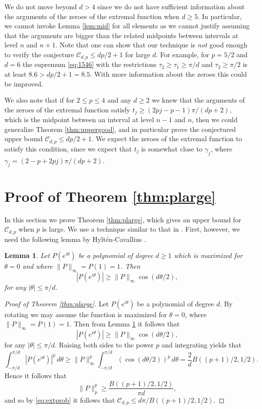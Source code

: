 \documentclass{amsart}
\theoremstyle{plain}
\newtheorem{lemma}[theorem]{Lemma}
\theoremstyle{remark}
\begin{document}
	We do not move beyond $d > 4$ since we do not have sufficient information about the arguments of the zeroes of the extremal function when $d \geq 5$. In particular, we cannot invoke Lemma \ref{lem:mid} for all elements as we cannot justify assuming that the arguments are bigger than the related midpoints between intervals at level $n$ and $n+1$. 
	Note that one can show that our technique is \emph{not} good enough to verify the conjecture $\mathscr{C}_{d,p} \leq dp/2+1$ for large $d$. For example, for $p=5/2$ and $d=6$ the supremum \eqref{eq:1546} with the restrictions $\tau_2 \geq \tau_1 \geq \pi/d$ and $\tau_3 \geq \pi/2$ is at least $8.6>dp/2+1=8.5$. With more information about the zeroes this could be improved. 
	
	We also note that if for $2 \leq p \leq 4$ and any $d \geq 2$ we knew that the arguments of the zeroes of the extremal function satisfy $t_j \geq (2pj-p-1)\pi/(dp+2)$, which is the midpoint between an interval at level $n-1$ and $n$, then we could generalize Theorem \ref{thm:uppergood}, and in particular prove the conjectured upper bound $\mathscr{C}_{d,p} \leq dp/2+1$. We expect the zeroes of the extremal function to satisfy this condition, since we expect that $t_j$ is somewhat close to $\gamma_j$, where $\gamma_j=(2-p+2pj)\pi/(dp+2)$. 
	
	\section{Proof of Theorem \ref{thm:plarge}}\label{sec:plarge}
	In this section we prove Theorem \ref{thm:plarge}, which gives an upper bound for $\mathscr{C}_{d,p}$ when $p$ is large. We use a technique similar to that in \cite[Section 7]{Brevig}. First, however, we need the following lemma by Hylt\'en-Cavallius \cite[Theorem 1]{Cavallius}.
	
	
	\begin{lemma}\label{lem:Cavllius}
		Let $P(e^{i\theta})$ be a polynomial of degree $d \geq 1$ which is maximized for $\theta=0$ and where $\|P\|_\infty=P(1)=1$. Then
		\[|P(e^{i \theta})| \geq \|P\|_\infty \cos( d \theta/2),\] for any $|\theta| \leq \pi/d$. 
	\end{lemma}
	
	\begin{proof}[Proof of Theorem \ref{thm:plarge}]
		Let $P(e^{i\theta})$ be a polynomial of degree $d$. By rotating we may assume the function is maximized for $\theta=0$, where $\|P\|_\infty=P(1)=1$. Then from Lemma \ref{lem:Cavllius}
		it follows that 
		\[|P(e^{i \theta})| \geq \|P\|_\infty \cos( d \theta/2),\] for any $|\theta| \leq \pi/d$. Raising both sides to the power $p$ and integrating yields that
		\[ \int_{-\pi/d}^{\pi/d} |P(e^{i\theta})|^p\, d \theta \geq \|P\|_\infty^p \int_{-\pi/d}^{\pi/d} (\cos(d \theta/2))^p \, d\theta=\frac{2}{d} B((p+1)/2,1/2).\] 
		Hence it follows that 
		\[\|P\|_p^p \geq \frac{B((p+1)/2,1/2)}{\pi d}, \]
		and so by \eqref{eq:extprob} it follows that $\mathscr{C}_{d,p} \leq d \pi/B((p+1)/2,1/2)$.
	\end{proof}
	
\end{document}

